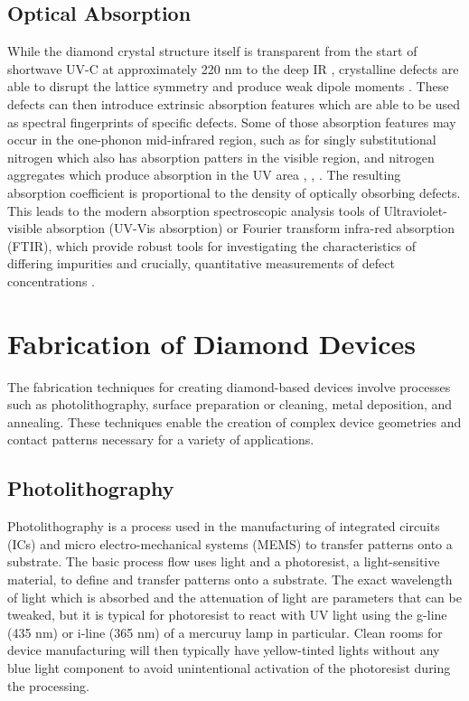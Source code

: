 \subsection{Optical Absorption}
While the diamond crystal structure itself is transparent from the start of shortwave UV-C at approximately 220 \si{\nano\metre} to the deep IR \cite{field2012}, crystalline defects are able to disrupt the lattice symmetry and produce weak dipole moments \cite{may1995}. These defects can then introduce extrinsic absorption features which are able to be used as spectral fingerprints of specific defects. Some of those absorption features may occur in the one-phonon mid-infrared region, such as for singly substitutional nitrogen which also has absorption patters in the visible region, and nitrogen aggregates which produce absorption in the UV area \cite{davies1976}, \cite{wang2004}, \cite{jones1992}. The resulting absorption coefficient is proportional to the density of optically obsorbing defects. This leads to the modern absorption spectroscopic analysis tools of Ultraviolet-visible absorption (UV-Vis absorption) or Fourier transform infra-red absorption (FTIR), which provide robust tools for investigating the characteristics of differing impurities and crucially, quantitative measurements of defect concentrations \cite{fadlelmoula2022}.

\section{Fabrication of Diamond Devices}
 The fabrication techniques for creating diamond-based devices involve processes such as photolithography, surface preparation or cleaning, metal deposition, and annealing. These techniques enable the creation of complex device geometries and contact patterns necessary for a variety of applications.
 
\subsection{Photolithography}
Photolithography is a process used in the manufacturing of integrated circuits (ICs) and micro electro-mechanical systems (MEMS) to transfer patterns onto a substrate. The basic process flow uses light and a photoresist, a light-sensitive material, to define and transfer patterns onto a substrate. The exact wavelength of light which is absorbed and the attenuation of light are parameters that can be tweaked, but it is typical for photoresist to react with UV light using the g-line (435 \si{\nano\metre}) or i-line (365 \si{\nano\metre}) of a mercuruy lamp in particular. Clean rooms for device manufacturing will then typically have yellow-tinted lights without any blue light component to avoid unintentional activation of the photoresist during the processing.

